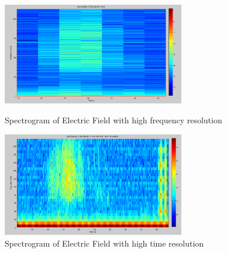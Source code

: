 \documentclass{article}
\begin{document}
\begin{figure}[htb!]
\begin{minipage}[c]{0.5\linewidth}
\centering
\includegraphics[width=8cm]{Figures/spectrogram_electric_highF.png}
\caption{Spectrogram of Electric Field with high frequency resolution}
\label{fig:spectrogram_electric_highF}
\end{minipage}
\hspace{0.1cm}
\begin{minipage}[c]{0.5\linewidth}
\centering
\includegraphics[width=8cm]{Figures/spectrogram_electric_highT.png}
\caption{Spectrogram of Electric Field with high time resolution}
\label{fig:spectrogram_electric_highT}
\end{minipage}
\end{figure}
\end{document}
